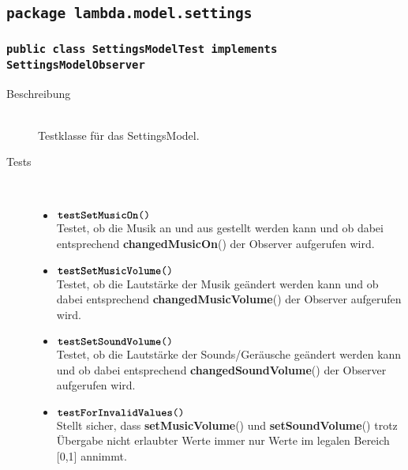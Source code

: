 \subsection{\texttt{package lambda.model.settings}}

\subsubsection{\normalfont \texttt{public class \textbf{SettingsModelTest} implements SettingsModelObserver}}

\begin{description}
\item[Beschreibung] \hfill \\ Testklasse für das SettingsModel.

\item[Tests] \hfill \\
	\vspace{-.8cm}
	\begin{itemize}
		\item $\texttt{\textbf{testSetMusicOn}()}$ \\ Testet, ob die Musik an und aus gestellt werden kann und ob dabei entsprechend \textbf{changedMusicOn}() der Observer aufgerufen wird.
		\item $\texttt{\textbf{testSetMusicVolume}()}$ \\ Testet, ob die Lautstärke der Musik geändert werden kann und ob dabei entsprechend \textbf{changedMusicVolume}() der Observer aufgerufen wird.
		\item $\texttt{\textbf{testSetSoundVolume}()}$ \\ Testet, ob die Lautstärke der Sounds/Geräusche geändert werden kann und ob dabei entsprechend \textbf{changedSoundVolume}() der Observer aufgerufen wird.
		\item $\texttt{\textbf{testForInvalidValues}()}$ \\ Stellt sicher, dass \textbf{setMusicVolume}() und  \textbf{setSoundVolume}() trotz Übergabe nicht erlaubter Werte immer nur Werte im legalen Bereich [0,1] annimmt.
	\end{itemize}
\end{description}